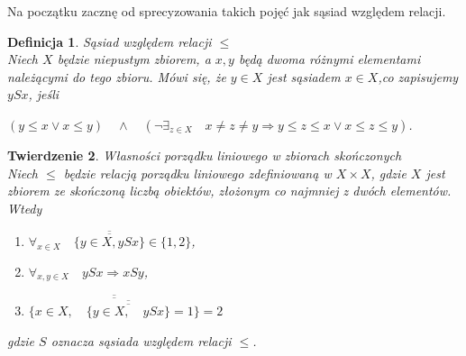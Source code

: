 \documentclass[12pt,a4paper]{report}
\newtheorem{theorem}{Twierdzenie}[section]
\newtheorem{definition}[theorem]{Definicja}
\newcommand{\licznosc}[1]{\overline{\overline{#1}}}
\begin{document}
Na początku zacznę od sprecyzowania takich pojęć jak sąsiad względem relacji.

\begin{definition}{Sąsiad względem relacji $\leq$\\}\label{def-sasiada}
Niech  $X$ będzie niepustym zbiorem, a $x, y$ będą dwoma różnymi elementami należącymi do tego zbioru. Mówi się, że $y \in X$ jest sąsiadem $x \in X$,co zapisujemy $ySx$, jeśli
\begin{center}
$\left(y \leq x \lor x \leq y \right) \quad \land \quad  \left(\lnot \exists_{z \in X}  \quad x\neq z \neq y \Rightarrow   y \leq z \leq x \lor x \leq z \leq y \right)$.\\
\end{center}
\end{definition}



\begin{theorem}{Własności porządku liniowego w zbiorach skończonych\\}
Niech $\leq$ będzie relacją porządku liniowego zdefiniowaną w $X \times X$, gdzie $X$ jest zbiorem ze skończoną liczbą obiektów, złożonym co najmniej z dwóch elementów. Wtedy
\begin{enumerate}
\item $\forall_{x \in X} \quad \licznosc{\{y \in X, ySx\}} \in \{1,2\}$,
\item $\forall_{x, y \in X} \quad ySx \Rightarrow xSy $,
\item $\licznosc{\{x \in X, \quad \licznosc{\{y \in X, \quad ySx \}}=1\}}=2$
\end{enumerate}
gdzie $S$ oznacza sąsiada względem relacji $\leq$.
\end{theorem}
\end{document}
